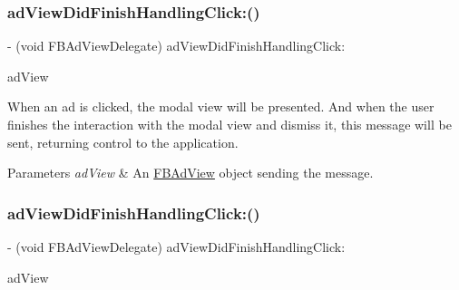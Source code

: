 \subsubsection{\texorpdfstring{ad\+View\+Did\+Finish\+Handling\+Click\+:()}{adViewDidFinishHandlingClick:()}\hspace{0.1cm}{\footnotesize\ttfamily [3/5]}}
{\footnotesize\ttfamily -\/ (void F\+B\+Ad\+View\+Delegate) ad\+View\+Did\+Finish\+Handling\+Click\+: \begin{DoxyParamCaption}\item[{(\hyperlink{interfaceFBAdView}{F\+B\+Ad\+View} $\ast$)}]{ad\+View }\end{DoxyParamCaption}\hspace{0.3cm}{\ttfamily [optional]}}

When an ad is clicked, the modal view will be presented. And when the user finishes the interaction with the modal view and dismiss it, this message will be sent, returning control to the application.


\begin{DoxyParams}{Parameters}
{\em ad\+View} & An \hyperlink{interfaceFBAdView}{F\+B\+Ad\+View} object sending the message. \\
\hline
\end{DoxyParams}
\mbox{\label{protocolFBAdViewDelegate_01-p_a7fb041c26e7163226dfc7f2565c543b6}} 
\subsubsection{\texorpdfstring{ad\+View\+Did\+Finish\+Handling\+Click\+:()}{adViewDidFinishHandlingClick:()}\hspace{0.1cm}{\footnotesize\ttfamily [4/5]}}
{\footnotesize\ttfamily -\/ (void F\+B\+Ad\+View\+Delegate) ad\+View\+Did\+Finish\+Handling\+Click\+: \begin{DoxyParamCaption}\item[{(\hyperlink{interfaceFBAdView}{F\+B\+Ad\+View} $\ast$)}]{ad\+View }\end{DoxyParamCaption}\hspace{0.3cm}{\ttfamily [optional]}}

